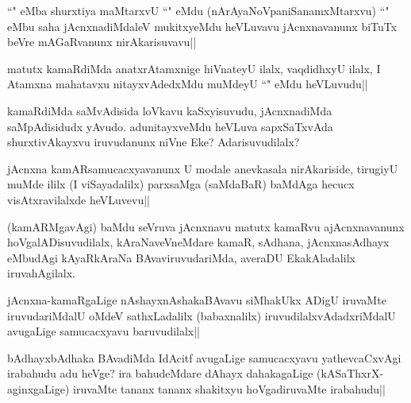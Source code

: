 
\begin{artha}
``\stext" eMba shurxtiya maMtarxvU ``\stext" eMdu (nArAyaNoVpaniSanamxMtarxvu) ``\stext" eMbu saha jAcnxnadiMdaleV mukitxyeMdu heVLuvavu jAcnxnavanunx biTuTx beVre mAGaRvanunx nirAkarisuvavu||
\end{artha}


\begin{artha}
matutx kamaRdiMda anatxrAtamxnige hiVnateyU ilalx, vaqdidhxyU ilalx, I Atamxna mahatavxu nitayxvAdedxMdu muMdeyU ``\stext" eMdu heVLuvudu||
\end{artha}


\begin{artha}
kamaRdiMda saMvAdisida loVkavu kaSxyisuvudu, jAcnxnadiMda saMpAdisidudx yAvudo. 
adunitayxveMdu heVLuva sapxSaTxvAda shurxtivAkayxvu iruvudanunx niVne Eke? Adarisuvudilalx?
\end{artha}

\begin{artha}
jAcnxna kamARsamucacxyavanunx U modale anevkasala nirAkariside, tirugiyU muMde ililx (I viSayadalilx) parxsaMga (saMdaBaR) baMdAga hecucx visAtxravilalxde heVLuvevu||
\end{artha}


\begin{artha}
(kamARMgavAgi) baMdu seVruva jAcnxnavu matutx kamaRvu ajAcnxnavanunx hoVgalADisuvudilalx, kAraNaveVneMdare kamaR, sAdhana, jAcnxnasAdhayx eMbudAgi kAyaRkAraNa BAvaviruvudariMda, averaDU EkakAladalilx iruvahAgilalx.
\end{artha}



\begin{artha}
jAcnxna-kamaRgaLige nAshayxnAshakaBAvavu siMhakUkx ADigU iruvaMte iruvudariMdalU oMdeV sathxLadalilx (babaxnalilx) iruvudilalxvAdadxriMdalU avugaLige samucacxyavu baruvudilalx||
\end{artha}

\begin{artha}
bAdhayxbAdhaka BAvadiMda IdAcitf avugaLige samucacxyavu yathevcaCxvAgi irabahudu adu heVge? ira bahudeMdare dAhayx dahakagaLige (kASaThxrX-aginxgaLige) iruvaMte tananx tananx shakitxyu hoVgadiruvaMte irabahudu||
\end{artha}

